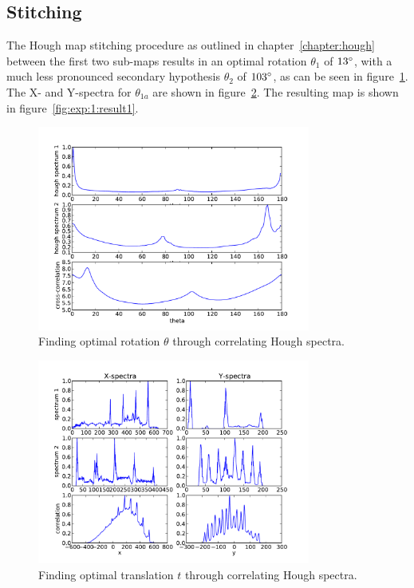 \subsection{Stitching}
The Hough map stitching procedure as outlined in chapter~\ref{chapter:hough} between the first two sub-maps results in an optimal rotation $\theta_1$ of $13\degree$, with a much less pronounced secondary hypothesis $\theta_2$ of $103\degree$, as can be seen in figure~\ref{fig:exp:1:theta}. The X- and Y-spectra for $\theta_{1a}$ are shown in figure~\ref{fig:exp:1:xy}. The resulting map is shown in figure~\ref{fig:exp:1:result1}.

\begin{figure}[ht]
  \centering
  \includegraphics[width=0.8\textwidth]{images/experiment/map1/stitch1-theta-correlation-result.pdf}
  \caption{Finding optimal rotation $\theta$ through correlating Hough spectra.}
  \label{fig:exp:1:theta}
\end{figure}

\begin{figure}[ht]
  \centering
  \includegraphics[width=0.8\textwidth]{images/experiment/map1/stitch1-1a-xy-correlation.pdf}
  \caption{Finding optimal translation $t$ through correlating Hough spectra.}
  \label{fig:exp:1:xy}
\end{figure}

